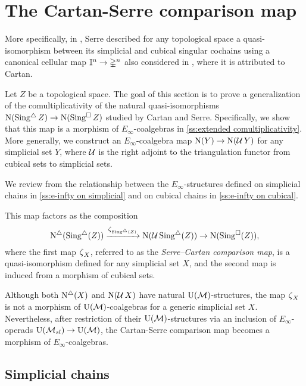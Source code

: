 
\section{The Cartan-Serre comparison map} \label{s:the cartan-serre comparison map}

More specifically, in \cite[p. 442]{serre1951homologie}, Serre described for any topological space a quasi-isomorphism between its simplicial and cubical singular cochains using a canonical cellular map $\mathbb{I}^n \to \mathbb{\Delta}^n$ also considered in \cite[p.199]{eilenberg1953acyclic}, where it is attributed to Cartan.

Let $Z$ be a topological space.
The goal of this section is to prove a generalization of the comultiplicativity of the natural quasi-isomorphisms $\operatorname{N}(\operatorname{Sing^{\triangle}} Z) \to \operatorname{N}(\operatorname{Sing^{\square}} Z)$ studied by Cartan and Serre.
Specifically, we show that this map is a morphism of $E_\infty$-coalgebras in \cref{ss:extended comultiplicativity}.
More generally, we construct an $E_\infty$-coalgebra map $\operatorname{N}(Y) \to \operatorname{N}(\operatorname{\mathcal{U}} Y)$ for any simplicial set $Y$, where $\operatorname{\mathcal{U}}$ is the right adjoint to the triangulation functor from cubical sets to simplicial sets.

We review from \cite{medina2021cubical} the relationship between the $E_\infty$-structures defined on simplicial chains in \cref{ss:e-infty on simplicial} and on cubical chains in \cref{ss:e-infty on cubical}.

This map factors as the composition
\[
\operatorname{N^{\triangle}}(\operatorname{Sing^{\triangle}}(Z)) \xrightarrow{\operatorname{\zeta}_{\operatorname{Sing^{\triangle}}(Z)}}
\operatorname{N}(\operatorname{\mathcal{U}} \operatorname{Sing^{\triangle}}(Z)) \to
\operatorname{N}(\operatorname{Sing^{\square}}(Z)),
\]
where the first map $\operatorname{\zeta}_X$, referred to as the \textit{Serre--Cartan comparison map}, is a quasi-isomorphism defined for any simplicial set $X$, and the second map is induced from a morphism of cubical sets.

Although both $\operatorname{N^{\triangle}}(X)$ and $\operatorname{N}(\operatorname{\mathcal{U}} X)$ have natural ${\operatorname{U}(\mathcal{M})}$-structures, the map $\operatorname{\zeta}_X$ is not a morphism of ${\operatorname{U}(\mathcal{M})}$-coalgebras for a generic simplicial set $X$.
Nevertheless, after restriction of their ${\operatorname{U}(\mathcal{M})}$-structures via an inclusion of $E_\infty$-operads ${\operatorname{U}(\mathcal{M}_{sl})} \to {\operatorname{U}(\mathcal{M})}$, the Cartan-Serre comparison map becomes a morphism of $E_\infty$-coalgebras.

\newpage

\subsection{Simplicial chains}

